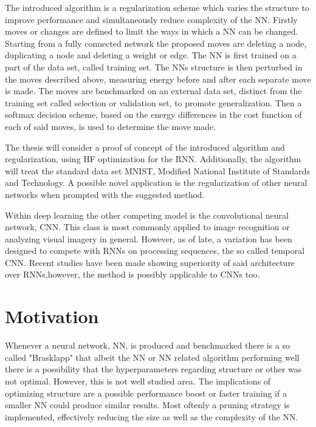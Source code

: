 The introduced algorithm is a regularization scheme which varies the structure to improve performance and simultaneously reduce complexity of the NN. Firstly moves or changes are defined to limit the ways in which a NN can be changed. Starting from a fully connected network the proposed moves are deleting a node, duplicating a node and deleting a weight or edge. The NN is first trained on a part of the data set, called training set. The NNs structure is then perturbed in the moves described above, measuring energy before and after each separate move is made. The moves are benchmarked on an external data set, distinct from the training set called selection or validation set, to promote generalization. Then a softmax decision scheme, based on the energy differences in the cost function of each of said moves, is used to determine the move made. 

The thesis will consider a proof of concept of the introduced algorithm and regularization, using HF optimization for the RNN. Additionally, the algorithm will treat the standard data set MNIST, Modified National Institute of Standards and Technology\cite{mnist}. A possible novel application is the regularization of other neural networks when prompted with the suggested method.

Within deep learning the other competing model is the convolutional neural network, CNN. This class is most commonly applied to image recognition or analyzing visual imagery in general. However, as of late, a variation has been designed to compete with RNNs on processing sequences, the so called temporal CNN. Recent studies have been made showing superiority of said architecture over RNNs\cite{tcnvsrnn},however, the method is possibly applicable to CNNs too.

\section{Motivation}

Whenever a neural network, NN, is produced and benchmarked there is a so called "Brasklapp" that albeit the NN or NN related algorithm performing well there is a possibility that the hyperparameters regarding structure or other was not optimal. However, this is not well studied area. The implications of optimizing structure are a possible performance boost or faster training if a smaller NN could produce similar results. Most oftenly a pruning strategy is implemented, effectively reducing the size as well as the complexity of the NN.  

